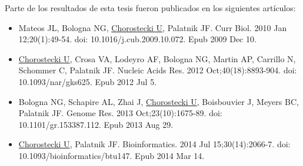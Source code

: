 
Parte de los resultados de esta tesis fueron publicados en los siguientes artículos:

\begin{itemize}

    \item Mateos JL, Bologna NG, \underline{Chorostecki U}, Palatnik JF. Curr Biol. 2010 Jan 12;20(1):49-54. doi: 10.1016/j.cub.2009.10.072. Epub 2009 Dec 10.
    \item \underline{Chorostecki U}, Crosa VA, Lodeyro AF, Bologna NG, Martin AP, Carrillo N, Schommer C, Palatnik JF. Nucleic Acids Res. 2012 Oct;40(18):8893-904. doi: 10.1093/nar/gks625. Epub 2012 Jul 5.
    \item Bologna NG, Schapire AL, Zhai J, \underline{Chorostecki U}, Boisbouvier J, Meyers BC, Palatnik JF. Genome Res. 2013 Oct;23(10):1675-89. doi: 10.1101/gr.153387.112. Epub 2013 Aug 29.
    \item \underline{Chorostecki U}, Palatnik JF. Bioinformatics. 2014 Jul 15;30(14):2066-7. doi: 10.1093/bioinformatics/btu147. Epub 2014 Mar 14.
\end{itemize}
